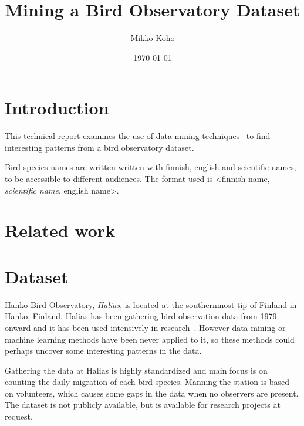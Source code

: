 \documentclass[english]{tktltiki2}
\title{Mining a Bird Observatory Dataset}
\author{Mikko Koho}
\date{\today}
\begin{document}
    

\frontmatter      %

\maketitle        %

\makeabstract     %

\tableofcontents  %


\mainmatter       %


\section{Introduction}

This technical report examines the use of data mining techniques~\cite{tan2006introduction} to find interesting patterns from a bird observatory dataset.

Bird species names are written written with finnish, english and scientific names, to be accessible to different audiences. The format used is <finnish name, \emph{scientific name}, english name>.


\section{Related work}


\section{Dataset}

Hanko Bird Observatory, \emph{Halias}, is located at the southernmost tip of Finland in Hanko, Finland. Halias has been gathering bird observation data from 1979 onward and it has been used intensively in research~\cite{HangonJulkaisut}. However data mining or machine learning methods have been never applied to it, so these methods could perhaps uncover some interesting patterns in the data.

Gathering the data at Halias is highly standardized and main focus is on counting the daily migration of each bird species. Manning the station is based on volunteers, which causes some gaps in the data when no observers are present.
The dataset is not publicly available, but is available for research projects at request.
\end{document}
